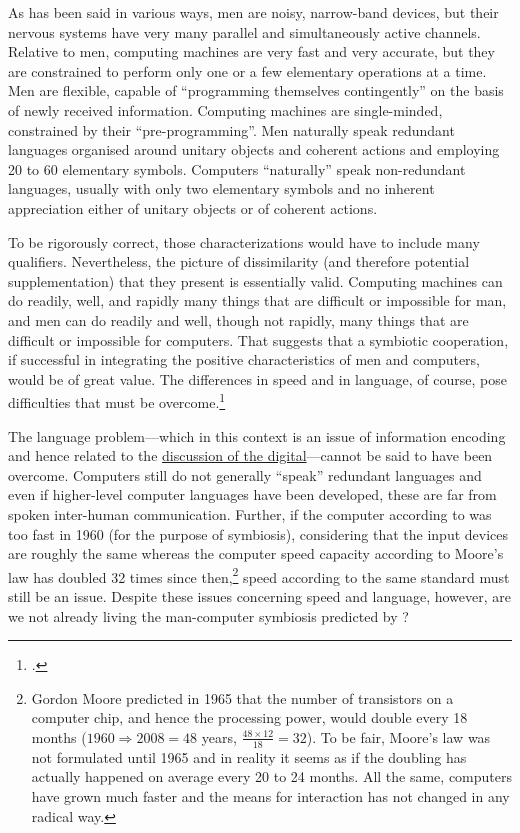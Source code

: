 \begin{squote}
As has been said in various ways, men are noisy, narrow-band   devices, but their nervous systems have very many parallel and   simultaneously active channels. Relative to men, computing machines   are very fast and very accurate, but they are constrained to perform   only one or a few elementary operations at a time. Men are flexible,   capable of ``programming themselves contingently'' on the basis of   newly received information. Computing machines are single-minded,   constrained by their ``pre-programming''. Men naturally speak   redundant languages organised around unitary objects and coherent   actions and employing 20 to 60 elementary symbols. Computers   ``naturally'' speak non-redundant languages, usually with only two   elementary symbols and no inherent appreciation either of unitary   objects or of coherent actions.

To be rigorously correct, those characterizations would have to   include many qualifiers. Nevertheless, the picture of dissimilarity   (and therefore potential supplementation) that they present is   essentially valid. Computing machines can do readily, well, and   rapidly many things that are difficult or impossible for man, and   men can do readily and well, though not rapidly, many things that   are difficult or impossible for computers. That suggests that a   symbiotic cooperation, if successful in integrating the positive   characteristics of men and computers, would be of great value. The   differences in speed and in language, of course, pose difficulties   that must be overcome.\footcite[Section 3.1]{licklider60}
\end{squote}

The language problem---which in this context is an issue of information encoding and hence related to the \hyperlink{interaction-digital}{discussion of the digital}---cannot be said to have been overcome. Computers still do not generally ``speak'' redundant languages and even if higher-level computer languages have been developed, these are far from spoken inter-human communication. Further, if the computer according to \citeauthor{licklider60} was too fast in 1960 (for the purpose of symbiosis), considering that the input devices are roughly the same whereas the computer speed capacity according to Moore's law has doubled 32 times since then,\footnote{Gordon Moore predicted in 1965 that the number of transistors on a computer chip, and hence the processing power, would double every 18 months ($1960\Rightarrow2008=48$ years, $\frac{48\times12}{18}=32$). To be fair, Moore's law was not formulated until 1965 and in reality it seems as if the doubling has actually happened on average every 20 to 24 months. All the same, computers have grown much faster and the means for interaction has not changed in any radical way.} speed according to the same standard must still be an issue. Despite these issues concerning speed and language, however, are we not already living the man-computer symbiosis predicted by \citeauthor{licklider60}?

